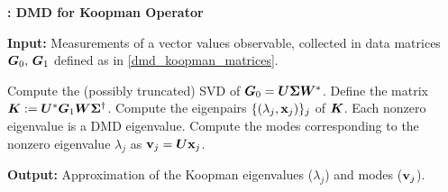 \begin{algorithm}[h]
\caption{\textbf{: DMD for Koopman Operator}}
\label{alg_koopman_dmd}
\textbf{Input:} Measurements of a vector values observable, collected in data matrices $\vb*{G}_0,\,\vb*{G}_1$ defined as in \eqref{dmd_koopman_matrices}.
\begin{algorithmic}[1]
\State Compute the (possibly truncated) SVD of $\vb*{G}_0 = \vb*{U}\vb*{\Sigma}\vb*{W}^*$.
\State Define the matrix $\vb*{K} := \vb*{U}^*\vb*{G}_1\vb*{W}\vb*{\Sigma}^{\dagger}$.
\State Compute the eigenpairs $\{(\lambda_j, \vb{x}_j)\}_j$ of $\vb*{K}$. Each nonzero eigenvalue is a DMD eigenvalue.
\State Compute the modes corresponding to the nonzero eigenvalue $\lambda_j$ as $\vb{v}_j = \vb*{U}\vb{x}_j$. 
\end{algorithmic}
\textbf{Output:} Approximation of the Koopman eigenvalues ($\lambda_j$) and modes ($\vb{v}_j$).
\end{algorithm}


